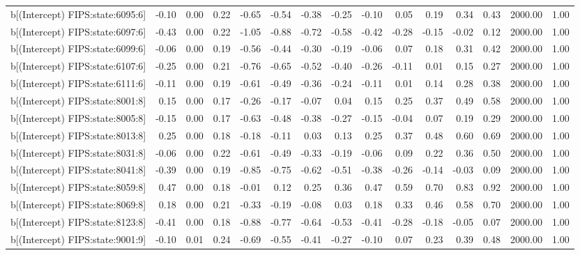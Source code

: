 \begin{table}[ht]
\begin{tabular}{rrrrrrrrrrrrrrr}
  b[(Intercept) FIPS:state:6095:6] & -0.10 & 0.00 & 0.22 & -0.65 & -0.54 & -0.38 & -0.25 & -0.10 & 0.05 & 0.19 & 0.34 & 0.43 & 2000.00 & 1.00 \\ 
  b[(Intercept) FIPS:state:6097:6] & -0.43 & 0.00 & 0.22 & -1.05 & -0.88 & -0.72 & -0.58 & -0.42 & -0.28 & -0.15 & -0.02 & 0.12 & 2000.00 & 1.00 \\ 
  b[(Intercept) FIPS:state:6099:6] & -0.06 & 0.00 & 0.19 & -0.56 & -0.44 & -0.30 & -0.19 & -0.06 & 0.07 & 0.18 & 0.31 & 0.42 & 2000.00 & 1.00 \\ 
  b[(Intercept) FIPS:state:6107:6] & -0.25 & 0.00 & 0.21 & -0.76 & -0.65 & -0.52 & -0.40 & -0.26 & -0.11 & 0.01 & 0.15 & 0.27 & 2000.00 & 1.00 \\ 
  b[(Intercept) FIPS:state:6111:6] & -0.11 & 0.00 & 0.19 & -0.61 & -0.49 & -0.36 & -0.24 & -0.11 & 0.01 & 0.14 & 0.28 & 0.38 & 2000.00 & 1.00 \\ 
  b[(Intercept) FIPS:state:8001:8] & 0.15 & 0.00 & 0.17 & -0.26 & -0.17 & -0.07 & 0.04 & 0.15 & 0.25 & 0.37 & 0.49 & 0.58 & 2000.00 & 1.00 \\ 
  b[(Intercept) FIPS:state:8005:8] & -0.15 & 0.00 & 0.17 & -0.63 & -0.48 & -0.38 & -0.27 & -0.15 & -0.04 & 0.07 & 0.19 & 0.29 & 2000.00 & 1.00 \\ 
  b[(Intercept) FIPS:state:8013:8] & 0.25 & 0.00 & 0.18 & -0.18 & -0.11 & 0.03 & 0.13 & 0.25 & 0.37 & 0.48 & 0.60 & 0.69 & 2000.00 & 1.00 \\ 
  b[(Intercept) FIPS:state:8031:8] & -0.06 & 0.00 & 0.22 & -0.61 & -0.49 & -0.33 & -0.19 & -0.06 & 0.09 & 0.22 & 0.36 & 0.50 & 2000.00 & 1.00 \\ 
  b[(Intercept) FIPS:state:8041:8] & -0.39 & 0.00 & 0.19 & -0.85 & -0.75 & -0.62 & -0.51 & -0.38 & -0.26 & -0.14 & -0.03 & 0.09 & 2000.00 & 1.00 \\ 
  b[(Intercept) FIPS:state:8059:8] & 0.47 & 0.00 & 0.18 & -0.01 & 0.12 & 0.25 & 0.36 & 0.47 & 0.59 & 0.70 & 0.83 & 0.92 & 2000.00 & 1.00 \\ 
  b[(Intercept) FIPS:state:8069:8] & 0.18 & 0.00 & 0.21 & -0.33 & -0.19 & -0.08 & 0.03 & 0.18 & 0.33 & 0.46 & 0.58 & 0.70 & 2000.00 & 1.00 \\ 
  b[(Intercept) FIPS:state:8123:8] & -0.41 & 0.00 & 0.18 & -0.88 & -0.77 & -0.64 & -0.53 & -0.41 & -0.28 & -0.18 & -0.05 & 0.07 & 2000.00 & 1.00 \\ 
  b[(Intercept) FIPS:state:9001:9] & -0.10 & 0.01 & 0.24 & -0.69 & -0.55 & -0.41 & -0.27 & -0.10 & 0.07 & 0.23 & 0.39 & 0.48 & 2000.00 & 1.00 \\ 

\end{tabular}
\end{table}
